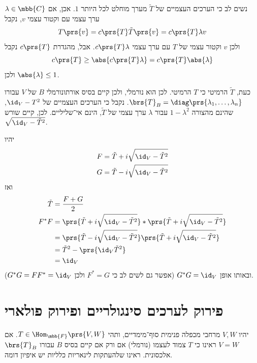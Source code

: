 \documentclass[a4paper,10pt,twoside,openany]{book}
\begin{document}
\begin{solution}
\begin{enumerate}
    נשים לב כי הערכים העצמיים של
    $\tilde{T}$
    מערך מוחלט לכל היותר
    $1$.
    אכן, אם
    $\lambda \in \mbb{C}$
    ערך עצמי עם וקטור עצמי
    $v$,
    נקבל
    \[T\prs{v} = c\prs{T} \tilde{T}\prs{v} = c\prs{T} \lambda v\]
    ולכן
    $v$
    וקטור עצמי של
    $T$
    עם ערך עצמי
    $c\prs{T} \lambda$.
    אבל, מהגדרת
    $c\prs{T}$
    נקבל
    \[c\prs{T} \geq \abs{c\prs{T} \lambda} = c\prs{T} \abs{\lambda}\]
    ולכן
    $\abs{\lambda} \leq 1$.
    
    כעת,
    $\tilde{T}$
    הרמיטי כי
    $T$
    הרמיטי. לכן הוא נורמלי, ולכן קיים בסיס אורתונורמלי
    $B$
    של
    $V$
    עבורו
    $\brs{T}_B = \diag\prs{\lambda_1, \ldots, \lambda_n}$.
    נקבל כי הערכים העצמיים של
    $\id_V - T^2$,
    שהינם מהצורה
    $1 - \lambda^2$
    עבור
    $\lambda$
    ערך עצמי של
    $\tilde{T}$,
    הינם אי־שליליים.
    לכן, קיים שורש
    $\sqrt{\id_V - \tilde{T}^2}$.
    
    יהיו
    \begin{align*}
        F &= \tilde{T} + i\sqrt{\id_V - \tilde{T}^2} \\
        G &= \tilde{T} - i\sqrt{\id_V - \tilde{T}^2}
    \end{align*}
    ואז
    \begin{align*}
        \tilde{T} &= \frac{F+G}{2} \\
        F^* F &= \prs{\tilde{T} + i\sqrt{\id_V - \tilde{T}^2}}* \prs{\tilde{T} + i\sqrt{\id_V - \tilde{T}^2}}
        \\&=
        \prs{\tilde{T} - i \sqrt{\id_V - \tilde{T}^2}}\prs{\tilde{T} + i\sqrt{\id_V - \tilde{T}^2}}
        \\&= \tilde{T}^2 - \prs{\id_V \tilde{T}^2}
        \\&= \id_V
    \end{align*}
    ובאותו אופן
    $G^* G = \id_V$
    (אפשר גם לשים לב כי
    $F^* = G$
    ולכן
    $G^* G = F F^* = \id_V$).
\end{enumerate}
\end{solution}

\section{פירוק לערכים סינגולריים ופירוק פולארי}

יהיו
$V,W$
מרחבי מכפלה פנימית סוף־מימדיים, ותהי
$T \in \Hom_{\mbb{F}}\prs{V,W}$.
אם
$V = W$
ראינו כי
$T$
צמוד לעצמו (נורמלי) אם ורק אם קיים בסיס
$B$
עבורו
$\brs{T}_B$
אלכסונית.
ראינו שלהעתקות לינאריות כלליות יש איפיון דומה.
\end{document}
